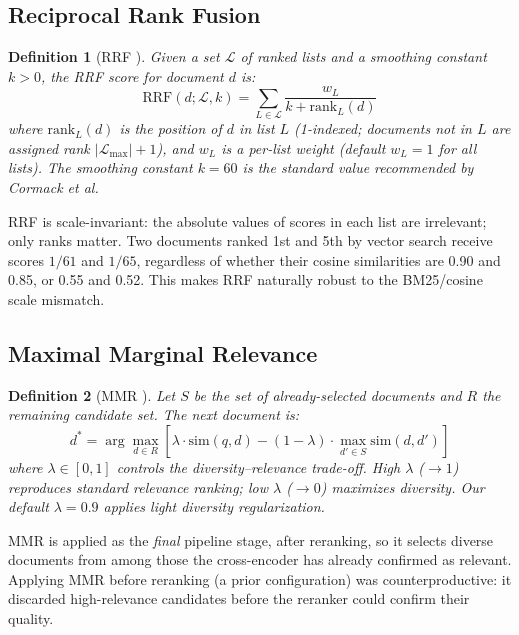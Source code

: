 \documentclass[11pt]{article}
\newtheorem{definition}{Definition}
\begin{document}
\subsection{Reciprocal Rank Fusion}

\begin{definition}[RRF \citep{cormack2009reciprocal}]
Given a set $\mathcal{L}$ of ranked lists and a smoothing constant $k > 0$, the RRF
score for document $d$ is:
\begin{equation}
  \text{RRF}(d; \mathcal{L}, k) = \sum_{L \in \mathcal{L}} \frac{w_L}{k + \text{rank}_L(d)}
\end{equation}
where $\text{rank}_L(d)$ is the position of $d$ in list $L$ (1-indexed; documents not
in $L$ are assigned rank $|\mathcal{L}_{\max}| + 1$), and $w_L$ is a per-list weight
(default $w_L = 1$ for all lists). The smoothing constant $k=60$ is the standard value
recommended by Cormack et al.
\end{definition}

RRF is scale-invariant: the absolute values of scores in each list are irrelevant; only
ranks matter. Two documents ranked 1st and 5th by vector search receive scores $1/61$
and $1/65$, regardless of whether their cosine similarities are 0.90 and 0.85, or 0.55
and 0.52. This makes RRF naturally robust to the BM25/cosine scale mismatch.

\subsection{Maximal Marginal Relevance}

\begin{definition}[MMR \citep{carbonell1998mmr}]
Let $S$ be the set of already-selected documents and $R$ the remaining candidate set.
The next document is:
\begin{equation}
  d^* = \arg\max_{d \in R} \left[\lambda \cdot \text{sim}(q, d)
    - (1-\lambda) \cdot \max_{d' \in S} \text{sim}(d, d')\right]
\end{equation}
where $\lambda \in [0,1]$ controls the diversity--relevance trade-off. High $\lambda$
($\to 1$) reproduces standard relevance ranking; low $\lambda$ ($\to 0$) maximizes
diversity. Our default $\lambda = 0.9$ applies light diversity regularization.
\end{definition}

MMR is applied as the \emph{final} pipeline stage, after reranking, so it selects
diverse documents from among those the cross-encoder has already confirmed as relevant.
Applying MMR before reranking (a prior configuration) was counterproductive: it
discarded high-relevance candidates before the reranker could confirm their quality.
\end{document}
